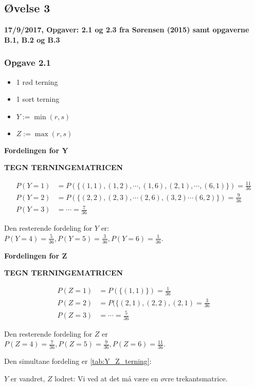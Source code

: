 \horizline

\subsection{Øvelse 3}

\textbf{17/9/2017, Opgaver: 2.1 og 2.3 fra Sørensen (2015) samt opgaverne B.1, B.2 og B.3}
\subsubsection{Opgave 2.1}

\begin{itemize}
    \item 1 rød terning
    \item 1 sort terning
    \item $Y := \min(r,s)$
    \item $Z := \max(r,s)$
\end{itemize}

\textbf{Fordelingen for Y}

\textbf{TEGN TERNINGEMATRICEN}

\begin{align}
    P(Y = 1) &= P(\{(1,1),(1,2),\cdots,(1,6),(2,1),\cdots,(6,1)\}) = \frac{11}{36} \\
    P(Y = 2) &= P(\{(2,2),(2,3), \cdots (2,6),(3,2) \cdots (6,2) \})= \frac{9}{36} \\
    P(Y = 3 ) &= \cdots = \frac{7}{36}
\end{align}

Den resterende fordeling for $Y$ er: $P(Y=4) = \frac{5}{36}, P(Y=5) = \frac{3}{36}, P(Y=6) = \frac{1}{36}$.

\textbf{Fordelingen for Z}

\textbf{TEGN TERNINGEMATRICEN}

\begin{align}
    P(Z = 1) &= P(\{(1,1)\}) = \frac{1}{36} \\
    P(Z = 2) &= P(\{(2,1),(2,2),(2,1) = \frac{3}{36} \\
    P(Z = 3 ) &= \cdots = \frac{5}{36}
\end{align}

Den resterende fordeling for $Z$ er $P(Z=4) = \frac{7}{36}, P(Z=5) = \frac{9}{36}, P(Z=6) = \frac{11}{36}$.

Den simultane fordeling er \ref{tab:Y_Z_terning}:


$Y$ er vandret, $Z$ lodret: Vi ved at det må være en øvre trekantsmatrice.

